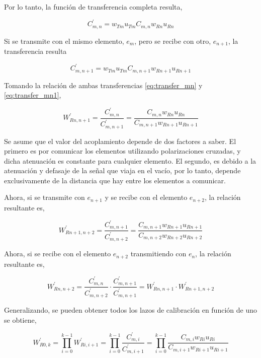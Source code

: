 Por lo tanto, la función de transferencia completa resulta,

\begin{equation}
	C^{'}_{m,n} = w_{Tm} u_{Tm} C_{m,n} w_{Rn} u_{Rn}
	\label{eq:transfer_mn}
\end{equation}

Si se transmite con el mismo elemento, $e_m$, pero se recibe con otro, $e_{n + 1}$, la transferencia resulta

\begin{equation}
	C^{'}_{m,n + 1} = w_{Tm} u_{Tm} C_{m,n + 1} w_{Rn + 1} u_{Rn + 1}
	\label{eq:transfer_mn1}
\end{equation}

Tomando la relación de ambas transferencias \ref{eq:transfer_mn} y \ref{eq:transfer_mn1},

\begin{equation}
	W^{'}_{Rn,n + 1} = \dfrac{C^{'}_{m,n}}{C^{'}_{m,n + 1}} = \dfrac{C_{m,n} w_{Rn} u_{Rn}}{C_{m,n + 1} w_{Rn + 1} u_{Rn + 1}}
\end{equation}

Se asume que el valor del acoplamiento depende de dos factores a saber. El primero es por comunicar los elementos utilizando
polarizaciones cruzadas, y dicha atenuación es constante para cualquier elemento. El segundo, es debido a la atenuación y
defasaje de la señal que viaja en el vacío, por lo tanto, depende exclusivamente de la distancia que hay entre los elementos
a comunicar.

Ahora, si se transmite con $e_{n+1}$ y se recibe con el elemento $e_{n+2}$, la relación resultante es,

\begin{equation}
	W^{'}_{Rn + 1,n + 2} = \dfrac{C^{'}_{m,n+1}}{C^{'}_{m,n+2}} = \dfrac{C_{m,n+1} w_{Rn+1} u_{Rn+1}}{C_{m,n + 2} w_{Rn + 2} u_{Rn + 2}}
\end{equation}

Ahora, si se recibe con el elemento $e_{n+2}$ transmitiendo con $e_n$, la relación resultante es,

\begin{equation}
	W^{'}_{Rn,n + 2} = \dfrac{C^{'}_{m,n}}{C^{'}_{m,n + 2}}\cdot\dfrac{C^{'}_{m,n+1}}{C^{'}_{m,n+1}} = W^{'}_{Rn,n+1}\cdot W^{'}_{Rn+1,n + 2}
\end{equation}

Generalizando, se pueden obtener todos los lazos de calibración en función de uno se obtiene,

\begin{equation}
	W^{'}_{R0,k} = \prod_{i=0}^{k-1} W^{'}_{Ri,i+1} = \prod_{i=0}^{k-1}\dfrac{C^{'}_{m,i}}{C^{'}_{m,i+1}} =
		\prod_{i=0}^{k-1}\dfrac{C_{m,i} w_{Ri} u_{Ri}}{C_{m,i + 1} w_{Ri + 1} u_{Ri + 1}}
	\label{eq:rx_cal}
\end{equation}


